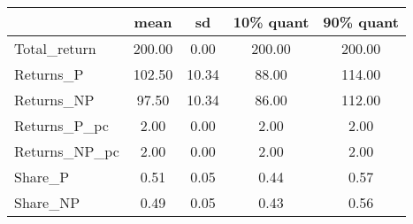\begin{tabular}{lcccc}
\toprule
{} &    mean &     sd &  10\% quant &  90\% quant \\
\midrule
Total\_return  &  200.00 &   0.00 &     200.00 &     200.00 \\
Returns\_P     &  102.50 &  10.34 &      88.00 &     114.00 \\
Returns\_NP    &   97.50 &  10.34 &      86.00 &     112.00 \\
Returns\_P\_pc  &    2.00 &   0.00 &       2.00 &       2.00 \\
Returns\_NP\_pc &    2.00 &   0.00 &       2.00 &       2.00 \\
Share\_P       &    0.51 &   0.05 &       0.44 &       0.57 \\
Share\_NP      &    0.49 &   0.05 &       0.43 &       0.56 \\
\bottomrule
\end{tabular}
